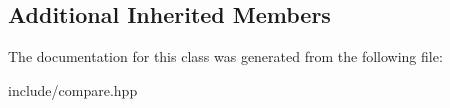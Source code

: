 \subsection*{Additional Inherited Members}


The documentation for this class was generated from the following file\+:\begin{DoxyCompactItemize}
\item 
include/compare.\+hpp\end{DoxyCompactItemize}
